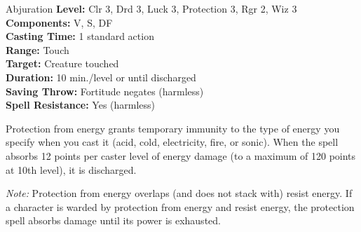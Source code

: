 {Abjuration}
{
	\textbf{Level:}
	Clr 3, Drd 3, Luck 3, Protection 3, Rgr 2, Wiz 3\\
	\textbf{Components:}
	V, S, DF\\
	\textbf{Casting Time:}
	1 standard action\\
	\textbf{Range:}
	Touch\\
	\textbf{Target:}
	Creature touched\\
	\textbf{Duration:}
	10 min./level or until discharged\\
	\textbf{Saving Throw:}
	Fortitude negates (harmless)\\
	\textbf{Spell Resistance:}
	Yes (harmless)\\
}
{
	Protection from energy grants temporary immunity to the type of energy you specify when you cast it (acid, cold, electricity, fire, or sonic). When the spell absorbs 12 points per caster level of energy damage (to a maximum of 120 points at 10th level), it is discharged.

	\textit{Note:} Protection from energy overlaps (and does not stack with) resist energy. If a character is warded by protection from energy and resist energy, the protection spell absorbs damage until its power is exhausted.

}
